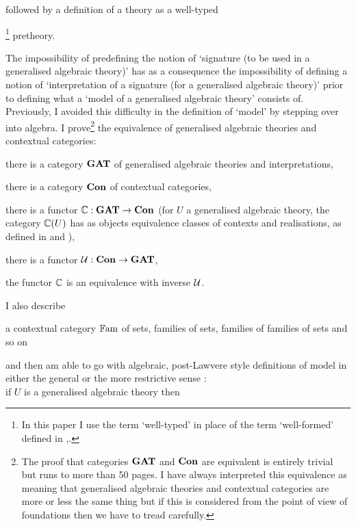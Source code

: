 followed by a definition of a theory as a well-typed{\footnote{In this paper I use the term `well-typed' in place of the term `well-formed' defined in \cite{Cartmell78},\cite{Cartmell86}.} pretheory. 

\note The impossibility of predefining the notion of `signature (to be used in a generalised algebraic theory)' has as a consequence
the impossibility of defining a notion of `interpretation of a signature (for a generalised algebraic theory)' prior to 
defining what a `model of a generalised algebraic theory' consists of.  Previously, I avoided this difficulty
in the definition of `model' by stepping over into algebra.
I prove\footnote{
The proof that categories $\catGAT$ and $\catCon$ are equivalent  is entirely trivial but runs to more than 50 pages. I have always interpreted this equivalence as meaning that generalised algebraic theories and contextual categories are more or less the same thing but if this is considered from the point of view of foundations then we have to tread carefully.} the equivalence of generalised algebraic theories and contextual categories: 
\noindent \label{ccgatequivalence}
\begin{point}
there is a category $\catGAT$ of generalised algebraic theories and interpretations,
\end{point}
\begin{point}
there is a category $\catCon$ of contextual categories,
\end{point}
\begin{point}
there is a functor $\ccat[C]: \catGAT \morph \catCon$  (for $U$ a generalised algebraic theory, the category $\ccat[C](U)$ 
has as objects equivalence classes of contexts and realisations, as defined 
in \cite{Cartmell78} and  \cite{Cartmell86}), 
\end{point}
\begin{point}
there is a functor $\gat[U]:\catCon \morph \catGAT$,
\end{point}
\begin{point}
the functor $\ccat[C]$ is an equivalence with inverse $\gat[U]$.
\end{point}
I also describe 
\begin{point}
a contextual category $\Fam$ of sets, families of sets, families of families of sets and so on 
\end{point}
and then am able to go with  algebraic, post-Lawvere
style  definitions of model in either the general or the more restrictive sense : \\
if $U$ is a generalised algebraic theory then
}
